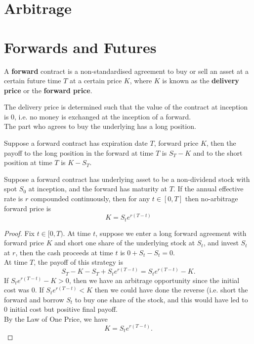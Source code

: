 \documentclass[11pt,fleqn]{book} %
\begin{document}

\section{Arbitrage}


\section{Forwards and Futures}

\begin{definition} \label{def:151}
A \textbf{forward} contract is a non-standardised agreement to buy or sell an asset at a certain future time \(T\) at a certain price \(K\), where \(K\) is known as the \textbf{delivery price} or the \textbf{forward price}.
\end{definition}

\begin{remark} \label{rmk:152}
The delivery price is determined such that the value of the contract at inception is 0, i.e. no money is
exchanged at the inception of a forward.\\
\indent The part who agrees to buy the underlying has a long position.
\end{remark}

\begin{remark} \label{rmk:153}
Suppose a forward contract has expiration date \(T\), forward price \(K\), then the payoff to the long position
in the forward at time \(T\) is \(S_T - K\) and to the short position at time \(T\) is \(K - S_T\).
\end{remark}

\begin{proposition} \label{prop:154}
Suppose a forward contract has underlying asset to be a non-dividend stock with spot \(S_0\) at inception,
and the forward has maturity at \(T\). If the annual effective rate is \(r\) compounded continuously,
then for any \(t \in [0, T]\) then no-arbitrage forward price is
\[
K = S_te^{r(T - t)}
\]
\end{proposition}

\begin{proof} Fix \(t \in [0, T)\). At time \(t\), suppose we enter a long forward agreement with forward
price \(K\) and short one share of the underlying stock at \(S_t\), and invest \(S_t\) at \(r\), then the cash
proceeds at time \(t\) is \(0 + S_t - S_t = 0\). \\
\indent At time \(T\), the payoff of this strategy is
\[
S_T - K - S_T + S_te^{r(T - t)} = S_te^{r(T - t)} - K.
\]
\indent If \(S_te^{r(T - t)} - K > 0\), then we have an arbitrage opportunity since the initial cost was 0. 
If $S_te^{r(T - t)} < K$ then we could have done the reverse (i.e. short the forward and borrow \(S_t\) to buy 
one share of the stock, and this would have led to 0 initial cost but positive final payoff.\\
\indent By the Law of One Price, we have
\[  
K = S_te^{r(T - t)}.
\]
\end{proof}
\end{document}

